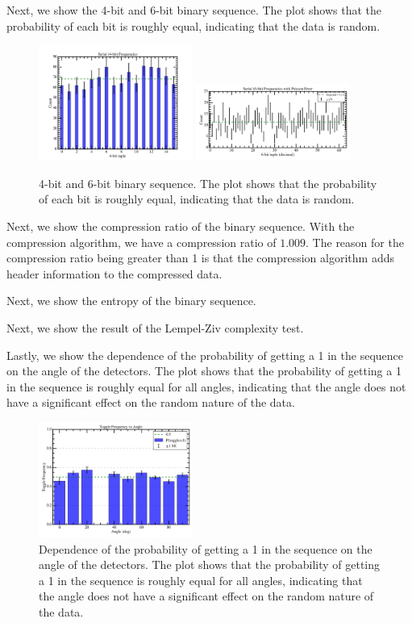 Next, we show the 4-bit and 6-bit binary sequence. The plot shows that the probability of each bit is roughly equal, indicating that the data is random.
\begin{figure}
\centering
\includegraphics[width=0.45\textwidth]{figure/plot_serial_4bit_frequencies.png}
\includegraphics[width=0.45\textwidth]{figure/plot_serial_6bit_frequencies.png}
\caption{4-bit and 6-bit binary sequence. The plot shows that the probability of each bit is roughly equal, indicating that the data is random.}
\label{fig:serial_4bit_6bit}
\end{figure}

Next, we show the compression ratio of the binary sequence. With the compression algorithm, we have a compression ratio of $1.009$. The reason for the compression ratio being greater than 1 is that the compression algorithm adds header information to the compressed data. 

Next, we show the entropy of the binary sequence. 

Next, we show the result of the Lempel-Ziv complexity test. 

Lastly, we show the dependence of the probability of getting a 1 in the sequence on the angle of the detectors. The plot shows that the probability of getting a 1 in the sequence is roughly equal for all angles, indicating that the angle does not have a significant effect on the random nature of the data.
\begin{figure}
\centering
\includegraphics[width=0.45\textwidth]{figure/plot_toggle_frequency_by_angle.png}
\caption{Dependence of the probability of getting a 1 in the sequence on the angle of the detectors. The plot shows that the probability of getting a 1 in the sequence is roughly equal for all angles, indicating that the angle does not have a significant effect on the random nature of the data.}
\label{fig:angle_dependence}
\end{figure}


